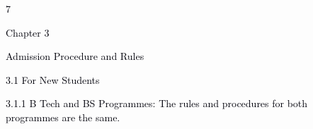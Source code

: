 \documentclass[12pt]{article}
\begin{document}
\vspace{\baselineskip}

\vspace{\baselineskip}

\vspace{\baselineskip}

\vspace{\baselineskip}

\vspace{\baselineskip}
\begin{Center}
\textcolor[HTML]{00000A}{7}
\end{Center}\par


\vspace{\baselineskip}
{\fontsize{14pt}{16.8pt}\selectfont \textcolor[HTML]{00000A}{Chapter 3}\par}\par


\vspace{\baselineskip}
{\fontsize{20pt}{24.0pt}\selectfont \textcolor[HTML]{00000A}{Admission Procedure and Rules}\par}\par


\vspace{\baselineskip}
\textcolor[HTML]{00000A}{3.1 For New Students}\par


\vspace{\baselineskip}
{\fontsize{10pt}{12.0pt}\selectfont \textcolor[HTML]{00000A}{3.1.1 B Tech and BS Programmes: The rules and procedures for both programmes are the same.}\par}\par
\end{document}
